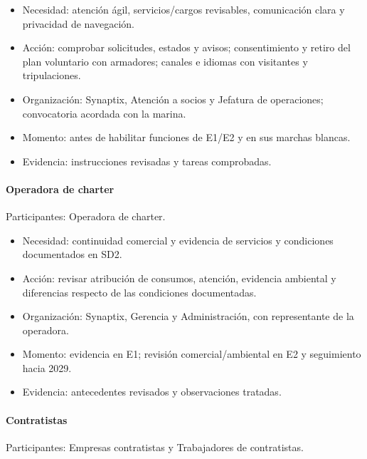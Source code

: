 \begin{itemize}
  \setlength{\itemsep}{2pt}
  \setlength{\parsep}{0pt}
  \item Necesidad: atención ágil, servicios/cargos revisables, comunicación clara y privacidad de navegación.
  \item Acción: comprobar solicitudes, estados y avisos; consentimiento y retiro del plan voluntario con armadores; canales e idiomas con visitantes y tripulaciones.
  \item Organización: Synaptix, Atención a socios y Jefatura de operaciones; convocatoria acordada con la marina.
  \item Momento: antes de habilitar funciones de E1/E2 y en sus marchas blancas.
  \item Evidencia: instrucciones revisadas y tareas comprobadas.
\end{itemize}

\paragraph{Operadora de charter}
\mbox{}\par
\noindent Participantes: Operadora de charter.

\begin{itemize}
  \setlength{\itemsep}{2pt}
  \setlength{\parsep}{0pt}
  \item Necesidad: continuidad comercial y evidencia de servicios y condiciones documentados en SD2.
  \item Acción: revisar atribución de consumos, atención, evidencia ambiental y diferencias respecto de las condiciones documentadas.
  \item Organización: Synaptix, Gerencia y Administración, con representante de la operadora.
  \item Momento: evidencia en E1; revisión comercial/ambiental en E2 y seguimiento hacia 2029.
  \item Evidencia: antecedentes revisados y observaciones tratadas.
\end{itemize}

\paragraph{Contratistas}
\mbox{}\par
\noindent Participantes: Empresas contratistas y Trabajadores de contratistas.

